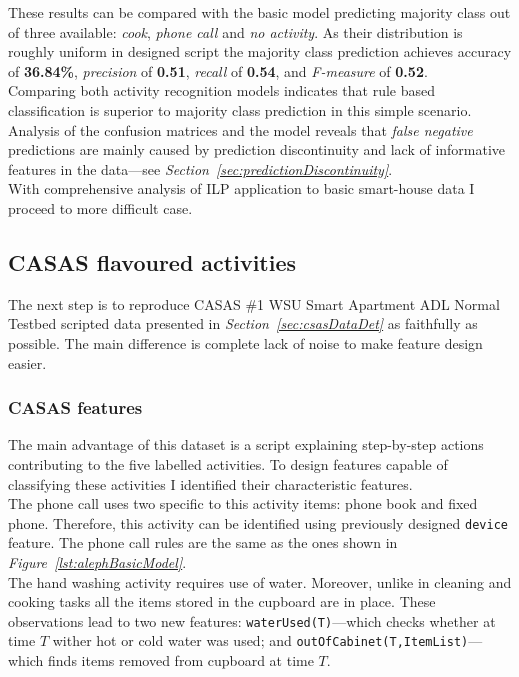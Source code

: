 \documentclass[10pt, a4paper, pdflatex, leqno, twoside, openright]{report}
\begin{document}
These results can be compared with the basic model predicting majority class out of three available: \emph{cook}, \emph{phone call} and \emph{no activity}. As their distribution is roughly uniform in designed script the majority class prediction achieves accuracy of \textbf{36.84\%}, \emph{precision} of \textbf{0.51}, \emph{recall} of \textbf{0.54}, and \emph{F-measure} of \textbf{0.52}.\\
Comparing both activity recognition models indicates that rule based classification is superior to majority class prediction in this simple scenario.\\

Analysis of the confusion matrices and the model reveals that \emph{false negative} predictions are mainly caused by prediction discontinuity and lack of informative features in the data---see \emph{Section~\ref{sec:predictionDiscontinuity}}.\\

With comprehensive analysis of ILP application to basic smart-house data I proceed to more difficult case.

    \subsection{CASAS flavoured activities\label{sec:CASASflavour}}
The next step is to reproduce CASAS \#1 WSU Smart Apartment ADL Normal Testbed scripted data presented in \emph{Section~\ref{sec:csasDataDet}} as faithfully as possible. The main difference is complete lack of noise to make feature design easier.

      \subsubsection{CASAS features}
The main advantage of this dataset is a script explaining step-by-step actions contributing to the five labelled activities. To design features capable of classifying these activities I identified their characteristic features.\\

The phone call uses two specific to this activity items: phone book and fixed phone. Therefore, this activity can be identified using previously designed \texttt{device} feature. The phone call rules are the same as the ones shown in \emph{Figure~\ref{lst:alephBasicModel}}.\\

The hand washing activity requires use of water. Moreover, unlike in cleaning and cooking tasks all the items stored in the cupboard are in place. These observations lead to two new features: \texttt{waterUsed(T)}---which checks whether at time $T$ wither hot or cold water was used; and \texttt{outOfCabinet(T,ItemList)}---which finds items removed from cupboard at time $T$.\\
\end{document}
